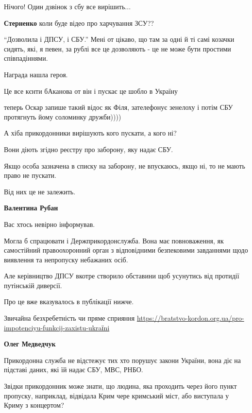 \begin{itemize}
Нічого! Один дзвінок з сбу все вирішить...

\textbf{Стерненко} коли буде відео про харчування ЗСУ??

\enquote{Дозволила і ДПСУ, і СБУ.} Мені от цікаво, що там за одні й ті самі козачки
сидять, які, я певен, за рублі все це дозволяють - це не може бути простими
співпадіннями.

Награда нашла героя.

Це все кєнти бАканова от він і пускає це шобло в Україну


теперь Оскар запише такий відос як Філя, зателефонує зенелоху і потім СБУ
протягнуть йому соломинку дружби))))


А хіба прикордонники вирішують кого пускати, а кого ні?

Вони діють згідно реєстру про заборону, яку надає СБУ.

Якщо особа зазначена в списку на заборону, не впускаюсь, якщо ні, то не мають
право не пускати.

Від них це не залежить.

\begin{itemize}
\textbf{Валентина Рубан}

Вас хтось невірно інформував.

Могла б спрацювати і Держприкордонслужба. Вона має повноваження, як самостійний
правоохоронний орган з відповідними безпековими завданнями щодо виявлення та
непропуску небажаних осіб.

Але керівництво ДПСУ вкотре створило обставини щоб усунутись від протидії путінській диверсії.

Про це вже вказувалось в публікації нижче.

Звичайна безхребетність чи пряме сприяння
\url{https://bratstvo-kordon.org.ua/pro-impotenciyu-funkcij-zaxistu-ukraїni}

\textbf{Олег Медведчук}

Прикордонна служба не відстежує тих хто порушує закони України, вона діє на
підставі даних, які їй надає СБУ, МВС, РНБО.

Звідки прикордонник може знати, що людина, яка проходить через його пункт
пропуску, наприклад, відвідала Крим чере кримський міст, або виступала у Криму
з концертом?


\end{itemize}
\end{itemize}
